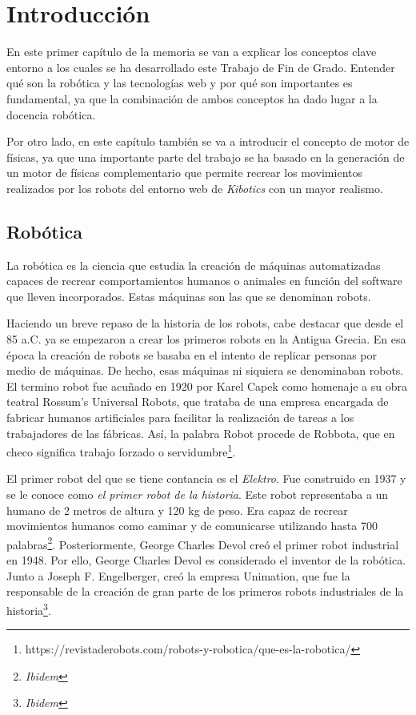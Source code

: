 \chapter{Introducción}
\label{chap:introduccion} 
En este primer capítulo de la memoria se van a explicar los conceptos clave entorno a los cuales se ha desarrollado este Trabajo de Fin de Grado. Entender qué son la robótica y las tecnologías web y por qué son importantes es fundamental, ya que la combinación de ambos conceptos ha dado lugar a la docencia robótica. \newline

Por otro lado, en este capítulo también se va a introducir el concepto de motor de físicas, ya que una importante parte del trabajo se ha basado en la generación de un motor de físicas complementario que permite recrear los movimientos realizados por los robots del entorno web de \textit{Kibotics} con un mayor realismo. \newline

\section{Robótica}
La robótica es la ciencia que estudia la creación de máquinas automatizadas capaces de recrear comportamientos humanos o animales en función del software que lleven incorporados. Estas máquinas son las que se denominan robots. \newline


Haciendo un breve repaso de la historia de los robots, cabe destacar que desde el 85 a.C. ya se empezaron a crear los primeros robots en la Antigua Grecia. En esa época la creación de robots se basaba en el intento de replicar personas por medio de máquinas. De hecho, esas máquinas ni siquiera se denominaban robots. El termino robot fue acuñado en 1920 por Karel Capek como homenaje a su obra teatral Rossum's Universal Robots, que trataba de una empresa encargada de fabricar humanos artificiales para facilitar la realización de tareas a los trabajadores de las fábricas. Así, la palabra Robot procede de Robbota, que en checo significa trabajo forzado o servidumbre\footnote{https://revistaderobots.com/robots-y-robotica/que-es-la-robotica/}. \newline


El primer robot del que se tiene contancia es el \textit{Elektro}. Fue construido en 1937 y se le conoce como \textit{el primer robot de la historia}. Este robot representaba a un humano de 2 metros de altura y 120 kg de peso. Era capaz de recrear movimientos humanos como caminar y de comunicarse utilizando hasta 700 palabras\footnote{\textit{Ibidem}}. Posteriormente, George Charles Devol creó el primer robot industrial en 1948. Por ello, George Charles Devol es considerado el inventor de la robótica. Junto a Joseph F. Engelberger, creó la empresa Unimation, que fue la responsable de la creación de gran parte de los primeros robots industriales de la historia\footnote{\textit{Ibidem}}.\newline

